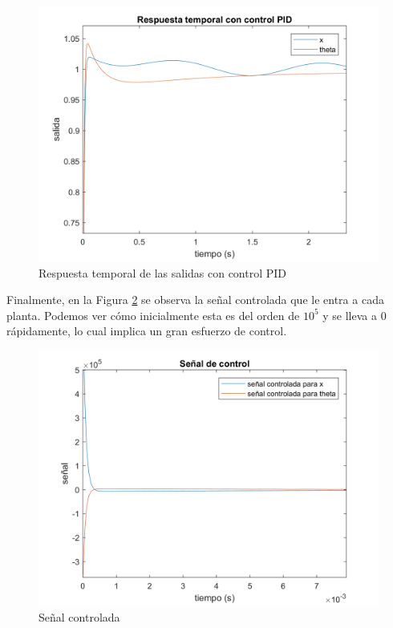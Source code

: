 \documentclass[journal]{IEEEtran}
\begin{document}
\begin{figure}[!h]
\caption{Respuesta temporal de las salidas con control PID\label{fig:PIDs}}
  \centering
\includegraphics[scale=0.18]{Bode/PID.png}
\end{figure}

Finalmente, en la Figura \ref{fig:senal} se observa la señal controlada que le entra a cada planta. Podemos ver cómo inicialmente esta es del orden de $10^5$ y se lleva a 0 rápidamente, lo cual implica un gran esfuerzo de control.

\begin{figure}[!h]
\caption{Señal controlada\label{fig:senal}}
  \centering
\includegraphics[scale=0.18]{Bode/se_al_controlada.png}
\end{figure}
\end{document}
